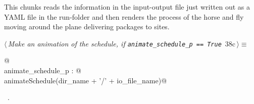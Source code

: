 \documentclass[11.5pt]{report}
\begin{document}
\vspace{-0.8cm} \newchunk This chunks reads the information in the input-output file just written out as
a YAML file in the run-folder and then renders the process of the horse and fly moving around the plane 
delivering packages to sites. 

\begin{flushleft} \small
\begin{minipage}{\linewidth}\label{scrap53}\raggedright\small
{} $\langle\,${\itshape Make an animation of the schedule, if \verb|animate_schedule_p == True|}\nobreak\ {\footnotesize {38c}}$\,\rangle\equiv$
\vspace{-1ex}
\begin{list}{}{} \item
\mbox{}\verb@   @\\
\mbox{}\verb@if animate_schedule_p : @\\
\mbox{}\verb@     animateSchedule(dir_name + '/' + io_file_name)@\\
\mbox{}\verb@@{\NWsep}
\end{list}
\vspace{-1.5ex}
\footnotesize
\begin{list}{}{\setlength{\itemsep}{-\parsep}\setlength{\itemindent}{-\leftmargin}}
\item \NWtxtMacroRefIn\ .

\item{}
\end{list}
\end{minipage}\vspace{4ex}
\end{flushleft}

\vspace{-0.8cm}\newchunk 
\end{document}
